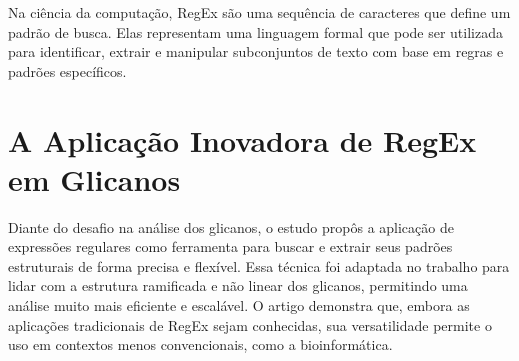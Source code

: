 Na ciência da computação, RegEx são uma sequência de caracteres que define um padrão de busca. Elas representam uma linguagem formal que pode ser utilizada para identificar, extrair e manipular subconjuntos de texto com base em regras e padrões específicos.

\section{A Aplicação Inovadora de RegEx em Glicanos}

Diante do desafio  na análise dos glicanos, o estudo propôs a aplicação de expressões regulares como ferramenta para buscar e extrair seus padrões estruturais de forma precisa e flexível. Essa técnica foi adaptada no trabalho para lidar com a estrutura ramificada e não linear dos glicanos, permitindo uma análise muito mais eficiente e escalável. O artigo demonstra que, embora as aplicações tradicionais de RegEx sejam conhecidas, sua versatilidade permite o uso em contextos menos convencionais, como a bioinformática.

